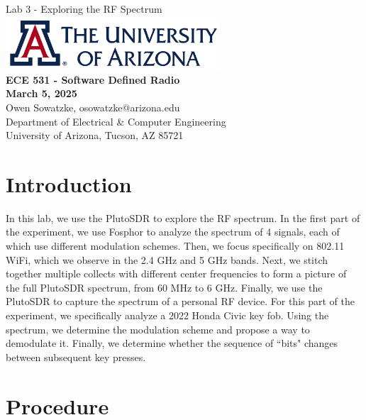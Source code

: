 \documentclass{article}
\begin{document}
\begin{titlepage}
	\centering
	{\huge Lab 3 - Exploring the RF Spectrum}\\[0.25 in]
	\includegraphics[width=0.6\textwidth]{ua_logo.png}\\[0.25 in]
	{\large \textbf{ECE 531 - Software Defined Radio\\[0.25 in]
	March 5, 2025\\[0.25 in]}}
	{\large Owen Sowatzke, osowatzke@arizona.edu\\[0.05 in]
	Department of Electrical \& Computer Engineering\\[0.05 in]
	University of Arizona, Tucson, AZ 85721\\[0.5 in]}
	\hypersetup{linkcolor=navy-blue}
	\noindent\hrulefill
	\tableofcontents
	\noindent\hrulefill
\end{titlepage}

\setlength{\parindent}{0pt}

\section{Introduction}

In this lab, we use the PlutoSDR to explore the RF spectrum. In the first part of the experiment, we use Fosphor to analyze the spectrum of 4 signals, each of which use different modulation schemes. Then, we focus specifically on 802.11 WiFi, which we observe in the 2.4 GHz and 5 GHz bands. Next, we stitch together multiple collects with different center frequencies to form a picture of the full PlutoSDR spectrum, from 60 MHz to 6 GHz. Finally, we use the PlutoSDR to capture the spectrum of a personal RF device. For this part of the experiment, we specifically analyze a 2022 Honda Civic key fob. Using the spectrum, we determine the modulation scheme and propose a way to demodulate it. Finally, we determine whether the sequence of ``bits" changes between subsequent key presses.

\section{Procedure}
\end{document}
